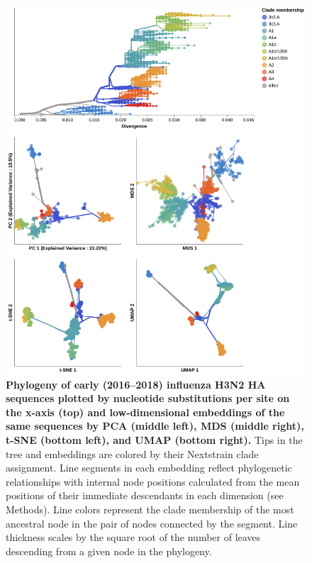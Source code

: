 \documentclass[10pt,letterpaper]{article}
\begin{document}

\begin{figure}[!h]
\includegraphics[width=\columnwidth]{figures/flu-2016-2018-ha-embeddings-by-clade.png}
\caption{{\bf Phylogeny of early (2016--2018) influenza H3N2 HA sequences plotted by nucleotide substitutions per site on the x-axis (top) and low-dimensional embeddings of the same sequences by PCA (middle left), MDS (middle right), t-SNE (bottom left), and UMAP (bottom right).}
  Tips in the tree and embeddings are colored by their Nextstrain clade assignment.
  Line segments in each embedding reflect phylogenetic relationships with internal node positions calculated from the mean positions of their immediate descendants in each dimension (see Methods).
  Line colors represent the clade membership of the most ancestral node in the pair of nodes connected by the segment.
  Line thickness scales by the square root of the number of leaves descending from a given node in the phylogeny.
}
\label{fig:seasonal-influenza-h3n2-ha-embeddings}
\end{figure}
\end{document}
